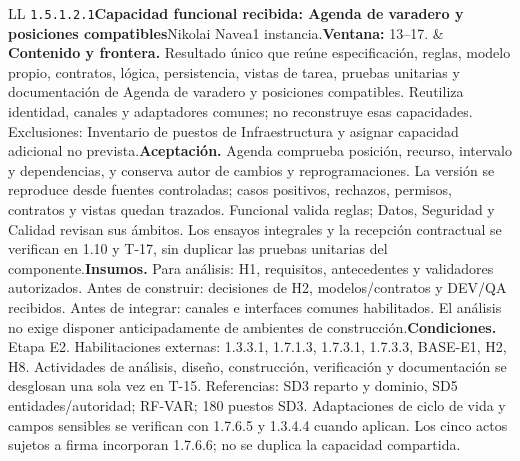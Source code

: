 \begin{longtable}{L{\tabcolsep\relax}L{\tabcolsep\relax}}
\texttt{1.\allowbreak{}5.\allowbreak{}1.\allowbreak{}2.\allowbreak{}1}\newline{}\textbf{Capacidad funcional recibida: Agenda de varadero y posiciones compatibles}\newline{}Nikolai Navea\newline{}1 instancia.\newline{}\textbf{Ventana:} 13--17. & \textbf{Contenido y frontera.} Resultado único que reúne especificación, reglas, modelo propio, contratos, lógica, persistencia, vistas de tarea, pruebas unitarias y documentación de Agenda de varadero y posiciones compatibles. Reutiliza identidad, canales y adaptadores comunes; no reconstruye esas capacidades. Exclusiones: Inventario de puestos de Infraestructura y asignar capacidad adicional no prevista.\newline{}\textbf{Aceptación.} Agenda comprueba posición, recurso, intervalo y dependencias, y conserva autor de cambios y reprogramaciones. La versión se reproduce desde fuentes controladas; casos positivos, rechazos, permisos, contratos y vistas quedan trazados. Funcional valida reglas; Datos, Seguridad y Calidad revisan sus ámbitos. Los ensayos integrales y la recepción contractual se verifican en 1.10 y T-17, sin duplicar las pruebas unitarias del componente.\newline{}\textbf{Insumos.} Para análisis: H1, requisitos, antecedentes y validadores autorizados. Antes de construir: decisiones de H2, modelos/contratos y DEV/QA recibidos. Antes de integrar: canales e interfaces comunes habilitados. El análisis no exige disponer anticipadamente de ambientes de construcción.\newline{}\textbf{Condiciones.} Etapa E2. Habilitaciones externas: 1.3.3.1, 1.7.1.3, 1.7.3.1, 1.7.3.3, BASE-E1, H2, H8. Actividades de análisis, diseño, construcción, verificación y documentación se desglosan una sola vez en T-15. Referencias: SD3 reparto y dominio, SD5 entidades/autoridad; RF-VAR; 180 puestos SD3. Adaptaciones de ciclo de vida y campos sensibles se verifican con 1.7.6.5 y 1.3.4.4 cuando aplican. Los cinco actos sujetos a firma incorporan 1.7.6.6; no se duplica la capacidad compartida.\\\hline

\end{longtable}
